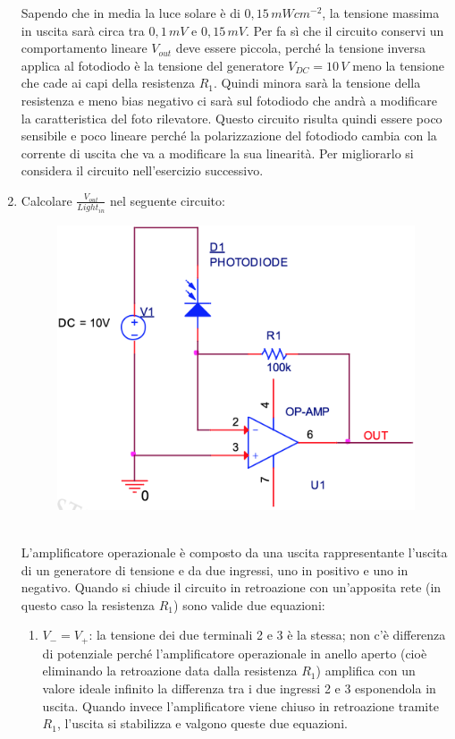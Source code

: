 \documentclass[12pt, a4paper]{report}
\begin{document}
\begin{appendices}
\begin{enumerate}
    Sapendo che in media la luce solare è di $0,15\,mWcm^{-2}$, la tensione massima in uscita sarà circa tra $0,1\,mV$ e $0,15\,mV$. Per fa sì che il circuito conservi un comportamento lineare $V_{out}$ deve essere piccola, perché la tensione inversa applica al fotodiodo è la tensione del generatore $V_{DC} = 10\,V$ meno la tensione che cade ai capi della resistenza $R_1$. Quindi minora sarà la tensione della resistenza e meno bias negativo ci sarà sul fotodiodo che andrà a modificare la caratteristica del foto rilevatore. Questo circuito risulta quindi essere poco sensibile e poco lineare perché la polarizzazione del fotodiodo cambia con la corrente di uscita che va a modificare la sua linearità. Per migliorarlo si considera il circuito nell'esercizio successivo.
    \item Calcolare $\frac{V_{out}}{Light_{in}}$ nel seguente circuito:
    \begin{figure}[h]
        \centering
       \includegraphics[scale=0.3,angle=0]{diodi_es3.png}
    \end{figure}
    \\L'amplificatore operazionale è composto da una uscita rappresentante l'uscita di un generatore di tensione e da due ingressi, uno in positivo e uno in negativo. Quando si chiude il circuito in retroazione con un'apposita rete (in questo caso la resistenza $R_1$) sono valide due equazioni:
    \begin{enumerate}
        \item $V_{-} = V_{+}$: la tensione dei due terminali 2 e 3 è la stessa; non c'è differenza di potenziale perché l'amplificatore operazionale in anello aperto (cioè eliminando la retroazione data dalla resistenza $R_1$) amplifica con un valore ideale infinito la differenza tra i due ingressi 2 e 3 esponendola in uscita. Quando invece l'amplificatore viene chiuso in retroazione tramite $R_1$, l'uscita si stabilizza e valgono queste due equazioni.

\end{enumerate}
\end{enumerate}
\end{appendices}
\end{document}
